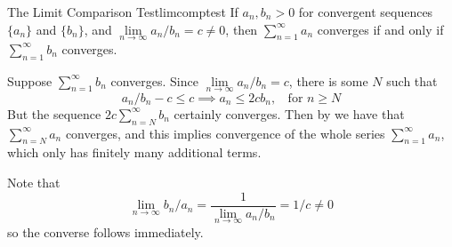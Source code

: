 \documentclass[12pt]{report}
\begin{document}
\begin{namthm}{The Limit Comparison Test}{limcomptest}
    If $a_n, b_n > 0$ for convergent sequences $\{a_n\}$ and $\{b_n\}$, and $\lim\limits_{n\rightarrow \infty}a_n/b_n = c \neq 0$, then $\sum\limits_{n=1}^{\infty}a_n$ converges if and only if $\sum\limits_{n=1}^{\infty}b_n$ converges.
\end{namthm}
\begin{proof*}{}{}
    Suppose $\sum\limits_{n=1}^{\infty}b_n$ converges. Since $\lim\limits_{n\rightarrow \infty}a_n/b_n = c$, there is some $N$ such that \begin{equation*}
        a_n/b_n - c \leq c \implies a_n \leq 2cb_n,\;\;\text{ for } n\geq N
    \end{equation*}
    But the sequence $2c\sum\limits_{n=N}^{\infty}b_n$ certainly converges. Then by  we have that $\sum\limits_{n=N}^{\infty}a_n$ converges, and this implies convergence of the whole series $\sum\limits_{n=1}^{\infty}a_n$, which only has finitely many additional terms.
    
    Note that \begin{equation*}
        \lim\limits_{n\rightarrow \infty}b_n/a_n = \frac{1}{\lim\limits_{n\rightarrow\infty}a_n/b_n} = 1/c \neq 0
    \end{equation*}
    so the converse follows immediately.
\end{proof*}
\end{document}

